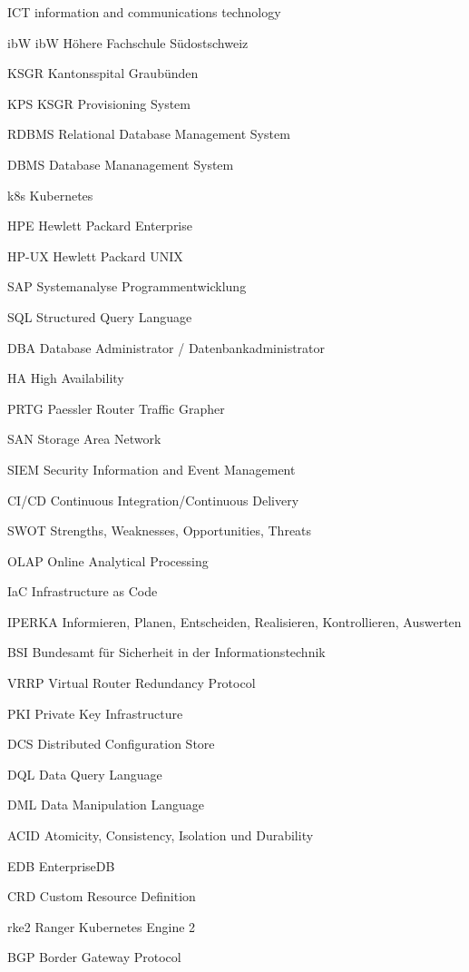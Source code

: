 
\begin{abkuerzungen}[MUSTER] %
    \item[ICT] information and communications technology
    \item[ibW] ibW Höhere Fachschule Südostschweiz
    \item[KSGR] Kantonsspital Graubünden
    \item[KPS] KSGR Provisioning System
    \item[\Gls{RDBMS}] Relational Database Management System
    \item[\Gls{DBMS}] Database Mananagement System
    \item[k8s] \Gls{Kubernetes}
    \item[HPE] Hewlett Packard Enterprise
    \item[\Gls{HP-UX}] Hewlett Packard \Gls{UNIX}
    \item[SAP] Systemanalyse Programmentwicklung
    \item[SQL] Structured Query Language
    \item[DBA] Database Administrator / Datenbankadministrator
    \item[HA] High Availability
    \item[\Gls{PRTG}] Paessler Router Traffic Grapher
    \item[\Gls{SAN}] Storage Area Network
    \item[\Gls{SIEM}] Security Information and Event Management
    \item[\Gls{CI/CD}] Continuous Integration/Continuous Delivery
    \item[\Gls{SWOT}] Strengths, Weaknesses, Opportunities, Threats
    \item[\Gls{OLAP}] Online Analytical Processing
    \item[IaC] Infrastructure as Code
    \item[IPERKA] Informieren, Planen, Entscheiden, Realisieren, Kontrollieren, Auswerten
    \item[BSI] Bundesamt für Sicherheit in der Informationstechnik
    \item[\Gls{VRRP}] Virtual Router Redundancy Protocol
    \item[\Gls{PKI}] Private Key Infrastructure
    \item[\Gls{DCS}] Distributed Configuration Store
    \item[DQL] Data Query Language
    \item[DML] Data Manipulation Language
    \item[ACID] Atomicity, Consistency, Isolation und Durability
    \item[EDB] EnterpriseDB
    \item[CRD] Custom Resource Definition
    \item[rke2] Ranger Kubernetes Engine 2
    \item[BGP] Border Gateway Protocol
\end{abkuerzungen}